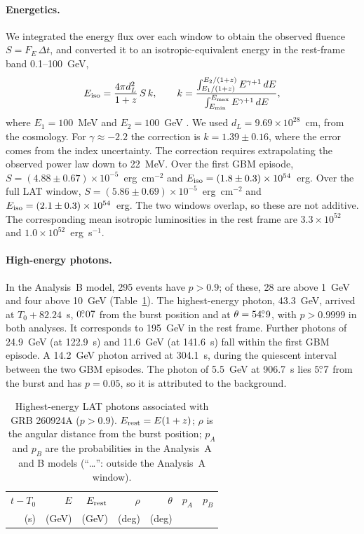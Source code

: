 \paragraph{Energetics.}
We integrated the energy flux over each window to obtain the observed fluence $S = F_E\,\Delta t$, and converted it
to an isotropic-equivalent energy in the rest-frame band 0.1--100~GeV,
\begin{equation}
  E_{\rm iso} = \frac{4\pi d_L^2}{1+z}\, S\, k,
  \qquad
  k = \frac{\int_{E_1/(1+z)}^{E_2/(1+z)} E^{\gamma+1}\, dE}{\int_{E_{\min}}^{E_{\max}} E^{\gamma+1}\, dE},
  \label{eq:eiso}
\end{equation}
where $E_1 = 100$~MeV and $E_2 = 100$~GeV \citep{Bloom2001}. We used $d_L = 9.69\times10^{28}$~cm, from the
\citet{Planck2020} cosmology. For $\gamma \approx -2.2$ the correction is $k = 1.39 \pm 0.16$, where the error comes
from the index uncertainty. The correction requires extrapolating the observed power law down to 22~MeV. Over the first
GBM episode, $S = (4.88 \pm 0.67)\times10^{-5}$~erg~cm$^{-2}$ and
$E_{\rm iso} = (1.8 \pm 0.3)\times10^{54}$~erg. Over the full LAT window, $S = (5.86 \pm 0.69)\times10^{-5}$~erg~cm$^{-2}$
and $E_{\rm iso} = (2.1 \pm 0.3)\times10^{54}$~erg. The two windows overlap, so these are not additive. The
corresponding mean isotropic luminosities in the rest frame are $3.3\times10^{52}$ and $1.0\times10^{52}$~erg~s$^{-1}$.

\paragraph{High-energy photons.}
In the Analysis~B model, 295 events have $p > 0.9$; of these, 28 are above 1~GeV and four above 10~GeV
(Table~\ref{tab:lat:photons}). The highest-energy photon, 43.3~GeV, arrived at $T_0+82.24$~s, $0\mbox{$.\!\!^\circ$}07$ from the
burst position and at $\theta = 54\mbox{$.\!\!^\circ$}9$, with $p > 0.9999$ in both analyses. It corresponds to 195~GeV in the
rest frame. Further photons of 24.9~GeV (at 122.9~s) and 11.6~GeV (at 141.6~s) fall within the first GBM episode.
A 14.2~GeV photon arrived at 304.1~s, during the quiescent interval between the two GBM episodes. The photon of
5.5~GeV at 906.7~s lies $5\mbox{$.\!\!^\circ$}7$ from the burst and has $p = 0.05$, so it is attributed to the background.

\begin{table}
  \centering
  \caption{Highest-energy LAT photons associated with GRB 260924A ($p>0.9$). $E_{\rm rest}=E(1+z)$; $\rho$ is the
  angular distance from the burst position; $p_A$ and $p_B$ are the probabilities in the Analysis~A and B models
  (``\ldots'': outside the Analysis~A window).}
  \label{tab:lat:photons}
  \begin{tabular}{rrrrrcc}
    \hline
    $t-T_0$ & $E$ & $E_{\rm rest}$ & $\rho$ & $\theta$ & $p_A$ & $p_B$ \\
    (s) & (GeV) & (GeV) & (deg) & (deg) & & \\
    \hline
    
  \end{tabular}
\end{table}

